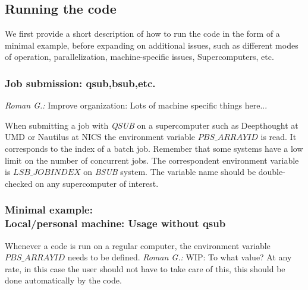 \documentclass{emulateapj}
\newcommand{\rg}[1]{\color{blue}\textit{Roman G.:} #1\color{black}}
\begin{document}
\subsection{{\bf Running} the code}
We first provide a short description of how to run the code in the
form of a minimal example, before expanding on additional issues, such
as different modes of operation, parallelization, machine-specific
issues, Supercomputers, etc.

\subsubsection{Job submission: qsub,bsub,etc.}
\rg{Improve organization: Lots of machine specific things here...}

When submitting a job with \textit{QSUB} on a supercomputer such as
Deepthought at UMD or Nautilus at NICS the environment variable
$PBS\_ARRAYID$ is read. It corresponds to the index of a batch job.
Remember that some systems have a low limit on the number of
concurrent jobs.  The correspondent environment variable is
$LSB\_JOBINDEX$ on \textit{BSUB} system. The variable name should be
double-checked on any supercomputer of interest.  

\subsubsection{{\bf Minimal example}: \\
  Local/personal machine: Usage without qsub}

Whenever a code is run on a regular computer, the environment variable
$PBS\_ARRAYID$ needs to be defined. \rg{WIP: To what value? At any
  rate, in this case the user should not have to take care of this,
  this should be done automatically by the code.}
\end{document}
